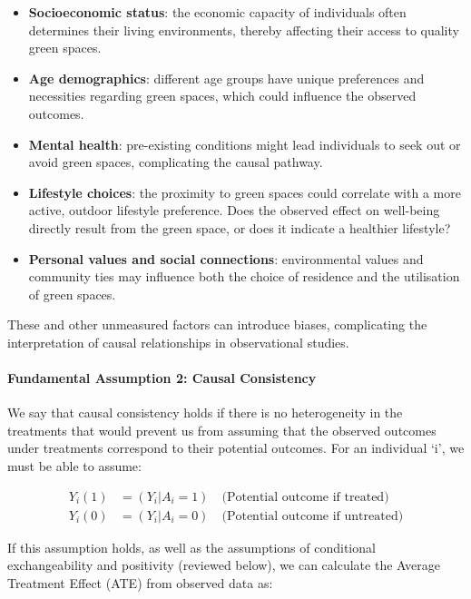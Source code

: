 \documentclass[
  singlecolumn]{article}
\let\oldparagraph\paragraph
\renewcommand{\paragraph}[1]{\oldparagraph{#1}\mbox{}}
\providecommand{\tightlist}{%
  \setlength{\itemsep}{0pt}\setlength{\parskip}{0pt}}\usepackage{longtable,booktabs,array}
\begin{document}
\begin{itemize}
\tightlist
\item
  \textbf{Socioeconomic status}: the economic capacity of individuals
  often determines their living environments, thereby affecting their
  access to quality green spaces.
\item
  \textbf{Age demographics}: different age groups have unique
  preferences and necessities regarding green spaces, which could
  influence the observed outcomes.
\item
  \textbf{Mental health}: pre-existing conditions might lead individuals
  to seek out or avoid green spaces, complicating the causal pathway.
\item
  \textbf{Lifestyle choices}: the proximity to green spaces could
  correlate with a more active, outdoor lifestyle preference. Does the
  observed effect on well-being directly result from the green space, or
  does it indicate a healthier lifestyle?
\item
  \textbf{Personal values and social connections}: environmental values
  and community ties may influence both the choice of residence and the
  utilisation of green spaces.
\end{itemize}

These and other unmeasured factors can introduce biases, complicating
the interpretation of causal relationships in observational studies.

\paragraph{Fundamental Assumption 2: Causal
Consistency}\label{fundamental-assumption-2-causal-consistency}

We say that causal consistency holds if there is no heterogeneity in the
treatments that would prevent us from assuming that the observed
outcomes under treatments correspond to their potential outcomes. For an
individual `i', we must be able to assume:

\[
\begin{aligned}
Y_{i}(1) &= (Y_{i}|A_{i} = 1) \quad \text{(Potential outcome if treated)} \\
Y_{i}(0) &= (Y_{i}|A_{i} = 0) \quad \text{(Potential outcome if untreated)}
\end{aligned}
\]

If this assumption holds, as well as the assumptions of conditional
exchangeability and positivity (reviewed below), we can calculate the
Average Treatment Effect (ATE) from observed data as:
\end{document}
